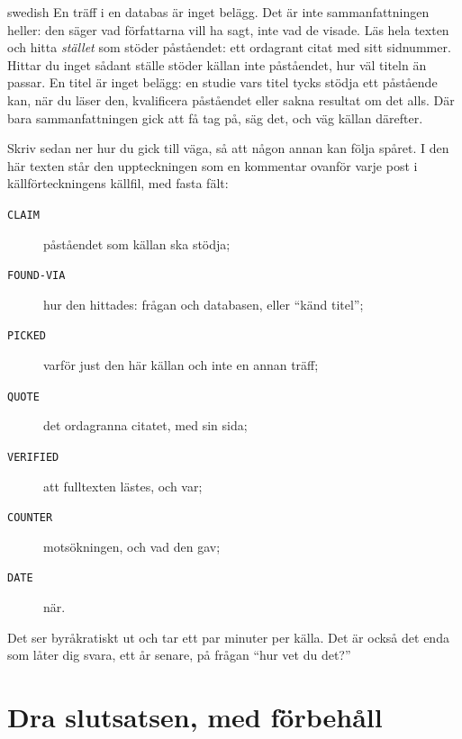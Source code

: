 \begin{onlyin}{swedish}
En träff i en databas är inget belägg.  Det är inte sammanfattningen
heller: den säger vad författarna vill ha sagt, inte vad de visade.  Läs
hela texten och hitta \emph{stället} som stöder påståendet: ett ordagrant
citat med sitt sidnummer.  Hittar du inget sådant ställe stöder källan
inte påståendet, hur väl titeln än passar.  En titel är inget belägg: en
studie vars titel tycks stödja ett påstående kan, när du läser den,
kvalificera påståendet eller sakna resultat om det alls.  Där bara
sammanfattningen gick att få tag på, säg det, och väg källan därefter.

Skriv sedan ner hur du gick till väga, så att någon annan kan följa
spåret.  I den här texten står den uppteckningen som en kommentar ovanför
varje post i källförteckningens källfil, med fasta fält:
\begin{description}
  \item[\texttt{CLAIM}] påståendet som källan ska stödja;
  \item[\texttt{FOUND-VIA}] hur den hittades: frågan och databasen,
    eller \enquote{känd titel};
  \item[\texttt{PICKED}] varför just den här källan och inte en annan
    träff;
  \item[\texttt{QUOTE}] det ordagranna citatet, med sin sida;
  \item[\texttt{VERIFIED}] att fulltexten lästes, och var;
  \item[\texttt{COUNTER}] motsökningen, och vad den gav;
  \item[\texttt{DATE}] när.
\end{description}
Det ser byråkratiskt ut och tar ett par minuter per källa.  Det är också
det enda som låter dig svara, ett år senare, på frågan \enquote{hur vet
du det?}
\end{onlyin}

\section{%
  {Dra slutsatsen, med förbehåll}} %


